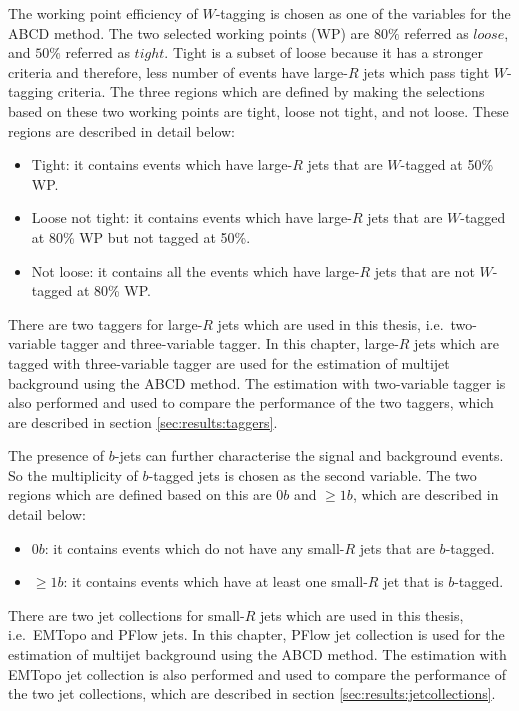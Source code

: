 The working point efficiency of $W$-tagging is chosen as one of the variables for the ABCD method. The two selected working points (WP) are $80\%$ referred as $loose$, and $50\%$ referred as $tight$. Tight is a subset of loose because it has a stronger criteria and therefore, less number of events have large-$R$ jets which pass tight $W$-tagging criteria. The three regions which are defined by making the selections based on these two working points are tight, loose not tight, and not loose. These regions are described in detail below:
\begin{itemize}
	\item Tight: it contains events which have large-$R$ jets that are $W$-tagged at 50\% WP.
	\item Loose not tight: it contains events which have large-$R$ jets that are $W$-tagged at 80\% WP but not tagged at 50\%.
	\item Not loose: it contains all the events which have large-$R$ jets that are not $W$-tagged at 80\% WP. 
\end{itemize}
There are two taggers for large-$R$ jets which are used in this thesis, i.e.\ two-variable tagger and three-variable tagger. In this chapter, large-$R$ jets which are tagged with three-variable tagger are used for the estimation of multijet background using the ABCD method. The estimation with two-variable tagger is also performed and used to compare the performance of the two taggers, which are described in section \ref{sec:results:taggers}.

The presence of $b$-jets can further characterise the signal and background events. So the multiplicity of $b$-tagged jets is chosen as the second variable. The two regions which are defined based on this are $0b$ and $\geq1b$, which are described in detail below:
\begin{itemize}
\item $0b$: it contains events which do not have any small-$R$ jets that are $b$-tagged.
\item $\geq1b$: it contains events which have at least one small-$R$ jet that is $b$-tagged.
\end{itemize}
There are two jet collections for small-$R$ jets which are used in this thesis, i.e.\ EMTopo and PFlow jets. In this chapter, PFlow jet collection is used for the estimation of multijet background using the ABCD method. The estimation with EMTopo jet collection is also performed and used to compare the performance of the two jet collections, which are described in section \ref{sec:results:jetcollections}.

